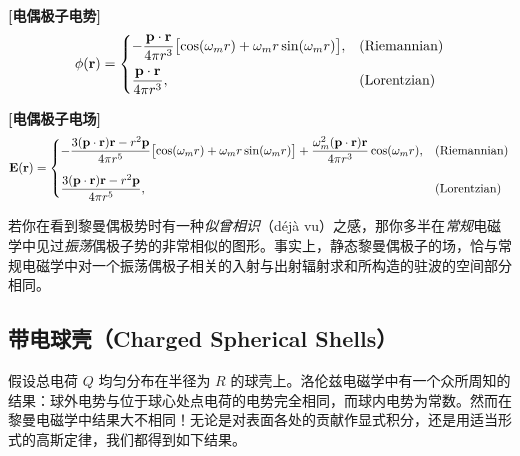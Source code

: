 \begin{keybox}[电偶极子]
\textbf{[电偶极子电势]}
\[
\phi(\mathbf{r}) = \begin{cases}
-\dfrac{\mathbf{p}\cdot\mathbf{r}}{4\pi r^{3}}
\bigl[\cos(\omega_m r) + \omega_m r\sin(\omega_m r)\bigr], & \text{(Riemannian)}\\[9pt]
\dfrac{\mathbf{p}\cdot\mathbf{r}}{4\pi r^{3}}, & \text{(Lorentzian)}
\end{cases}
\]

\textbf{[电偶极子电场]}
\[
\mathbf{E}(\mathbf{r}) = \begin{cases}
-\dfrac{3(\mathbf{p}\cdot\mathbf{r})\mathbf{r} - r^{2}\mathbf{p}}{4\pi r^{5}}
\bigl[\cos(\omega_m r) + \omega_m r\sin(\omega_m r)\bigr]
+ \dfrac{\omega_m^{2}(\mathbf{p}\cdot\mathbf{r})\mathbf{r}}{4\pi r^{3}}\cos(\omega_m r), & \text{(Riemannian)}\\[12pt]
\dfrac{3(\mathbf{p}\cdot\mathbf{r})\mathbf{r} - r^{2}\mathbf{p}}{4\pi r^{5}}, & \text{(Lorentzian)}
\end{cases}
\]
\end{keybox}

若你在看到黎曼偶极势时有一种\emph{似曾相识}（déjà vu）之感，那你多半在\emph{常规}电磁学中见过\emph{振荡}偶极子势的非常相似的图形。事实上，静态黎曼偶极子的场，恰与常规电磁学中对一个振荡偶极子相关的入射与出射辐射求和所构造的驻波的空间部分相同。

\subsection{带电球壳（Charged Spherical Shells）}

假设总电荷 $Q$ 均匀分布在半径为 $R$ 的球壳上。洛伦兹电磁学中有一个众所周知的结果：球外电势与位于球心处点电荷的电势完全相同，而球内电势为常数。然而在黎曼电磁学中结果大不相同！无论是对表面各处的贡献作显式积分，还是用适当形式的高斯定律，我们都得到如下结果。

